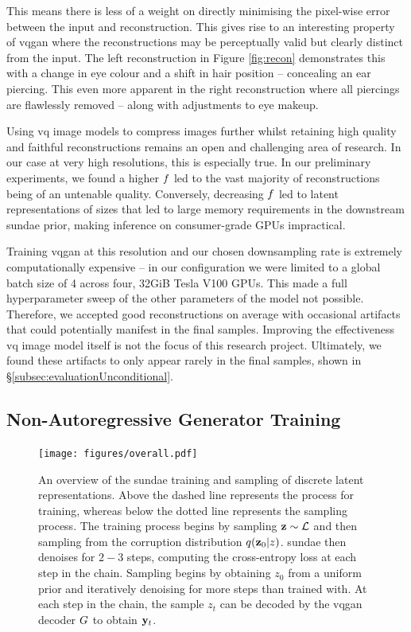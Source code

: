 This means there is less of a weight on directly minimising the pixel-wise error
between the input and reconstruction. This gives rise to an interesting property
of \gls{vqgan} where the reconstructions may be perceptually valid but clearly
distinct from the input. The left reconstruction in Figure \ref{fig:recon}
demonstrates this with a change in eye colour and a shift in hair position --
concealing an ear piercing. This even more apparent in the right reconstruction
where all piercings are flawlessly removed -- along with adjustments to eye
makeup.

Using \gls{vq} image models to compress images further whilst retaining high
quality and faithful reconstructions remains an open and challenging area of
research. In our case at very high resolutions, this is especially true. In our
preliminary experiments, we found a higher $f$ led to the vast
majority of reconstructions being of an untenable quality. Conversely, decreasing
$f$ led to latent representations of sizes that led to large
memory requirements in the downstream \gls{sundae} prior, making inference on
consumer-grade GPUs impractical.

Training \gls{vqgan} at this resolution and our chosen downsampling rate is
extremely computationally expensive -- in our configuration we were limited to a
global batch size of 4 across four, 32GiB Tesla V100 GPUs. This made a full
hyperparameter sweep of the other parameters of the model not possible.
Therefore, we accepted good reconstructions on average with occasional
artifacts that could potentially manifest in the final samples. Improving the
effectiveness \gls{vq} image model itself is not the focus of this research
project. Ultimately, we found these artifacts to only appear rarely in the final
samples, shown in \S\ref{subsec:evaluationUnconditional}.

\subsection{Non-Autoregressive Generator Training}
\label{subsec:sundaeTraining}

\begin{figure}[ht]
    \centering
    \texttt{[image: figures/overall.pdf]}
    \caption{
        An overview of the \gls{sundae} training and sampling of discrete latent
        representations. Above the dashed line represents the process for
        training, whereas below the dotted line represents the sampling process.
        The training process begins by sampling $\mathbf{z} \sim \mathcal{L}$
        and then sampling from the corruption distribution $q(\mathbf{z}_0 \vert
        z)$. \Gls{sundae} then denoises for $2-3$ steps, computing the
        cross-entropy loss at each step in the chain. Sampling begins by
        obtaining $z_0$ from a uniform prior and iteratively denoising for more
        steps than trained with. At each step in the chain, the sample $z_t$ can
        be decoded by the \gls{vqgan} decoder $G$ to obtain
        $\mathbf{y}_t$.
    }
    \label{fig:overall}
\end{figure}

